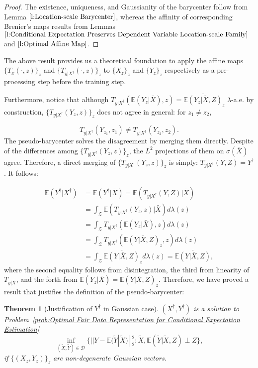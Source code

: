 \documentclass[twoside,11pt]{article}
\newtheorem{thm}{Theorem}[section]{\bfseries}{\itshape}
\begin{document}
\begin{proof}
The existence, uniqueness, and Gaussianity of the barycenter follow from Lemma $\ref{l:Location-scale Barycenter}$, whereas the affinity of corresponding Brenier's maps results from Lemmas $\ref{l:Conditional Expectation Preserves Dependent Variable Location-scale Family}$ and $\ref{l:Optimal Affine Map}$.
\end{proof}

The above result provides us a theoretical foundation to apply the affine maps $\{T_x(\cdot,z)\}_z$ and $\{T_{y|X^{\dag}}(\cdot,z)\}_z$ to $\{X_z\}_z$ and $\{Y_z\}_z$ respectively as a pre-processing step before the training step. 

Furthermore, notice that although $T_{y|X^{\dag}}(\mathbb{E}(Y_z|\bar{X}),z) = \overline{\mathbb{E}(Y_z| \bar{X},Z)}_z$ $ \lambda$-a.e. by construction,  $\{T_{y|X^{\dag}}(Y_z,z) \}_z$ does not agree in general: for $z_1 \neq z_2$,

\begin{equation}
T_{y|X^{\dag}}  (Y_{z_1},{z_1}) \neq T_{y|X^{\dag}} (Y_{z_2}, {z_2}).
\end{equation}
The pseudo-barycenter solves the disagreement by merging them directly.  Despite of the differences among $\{T_{y|X^{\dag}} (Y_z,z) \}_z$, the $L^2$ projections of them on $\sigma(\bar{X})$ agree. Therefore, a direct merging of $\{T_{y|X^{\dag}} (Y_z,z) \}_z$ is simply: $T_{y|X^{\dag}} (Y,Z) = Y^{\dag}$. It follows:

\begin{align*}
\mathbb{E}(Y^{\dag}|X^{\dag}) & = \mathbb{E}(Y^{\dag}|\bar{X}) = \mathbb{E}(T_{y|X^{\dag}}(Y,Z)|\bar{X})\\
& = \int_{\mathcal{Z}} \mathbb{E}( T_{y|X^{\dag}} (Y_z,z) | \bar{X}) d\lambda(z)\\
& = \int_{\mathcal{Z}} T_{y|X^{\dag}} (\mathbb{E}(Y_z| \bar{X}),z) d\lambda(z)\\
& = \int_{\mathcal{Z}} T_{y|X^{\dag}} (\mathbb{E}(Y| \bar{X},Z)_z,z) d\lambda(z)\\
& = \int_{\mathcal{Z}} \overline{\mathbb{E}(Y| \bar{X},Z)}_z d\lambda(z) = \overline{\mathbb{E}(Y| \bar{X},Z)},
\end{align*}
where the second equality follows from disintegration, the third from linearity of $T_{y|\bar{X}}$, and the forth from $\mathbb{E}(Y_z| \bar{X}) = \mathbb{E}(Y| \bar{X},Z)_z$. Therefore, we have proved a result that justifies the definition of the pseudo-barycenter:

\begin{thm}[Justification of $Y^{\dag}$ in Gaussian case] \label{th:Justification of Dependent Pseudo-barycenter in Gaussian Case}
$(X^{\dag}, Y^{\dag})$ is a solution to Problem~\ref{prob:Optimal Fair Data Representation for Conditional Expectation Estimation}
\begin{equation}
\inf_{(\tilde{X},\tilde{Y}) \in \mathcal{D}} \{ ||Y - \mathbb{E}(\tilde{Y}|\tilde{X})||^2_2: \tilde{X}, \mathbb{E}(\tilde{Y}|\tilde{X},Z) \perp Z\},
\end{equation}
if $\{(X_z,Y_z)\}_z$ are non-degenerate Gaussian vectors.
\end{thm}
\end{document}
